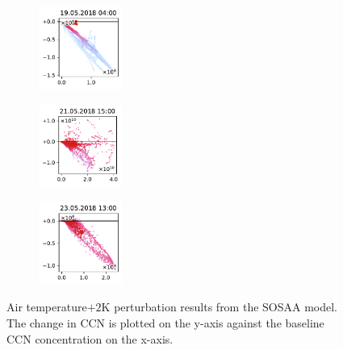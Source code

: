 \begin{figure}[H]
    \begin{subfigure}
        \centering
        \includegraphics[width=0.30\textwidth,valign=t]{evaluation/figures/perturbations/perturbation-19.05.2018:04.00-temperature-add-2K.pdf}
    \end{subfigure}
    \begin{subfigure}
        \centering
        \includegraphics[width=0.30\textwidth,valign=t]{evaluation/figures/perturbations/perturbation-21.05.2018:15.00-temperature-add-2K.pdf}
    \end{subfigure}
    \begin{subfigure}
        \centering
        \includegraphics[width=0.30\textwidth,valign=t]{evaluation/figures/perturbations/perturbation-23.05.2018:13.00-temperature-add-2K.pdf}
    \end{subfigure}

    \caption[Temperature$+ 2\text{K}$ perturbation SOSAA results]{Air temperature$+ 2\text{K}$ perturbation results from the SOSAA model. The change in CCN is plotted on the y-axis against the baseline CCN concentration on the x-axis.}
    \label{fig:sosaa-perturbation-temperature-add-2K}
\end{figure}

